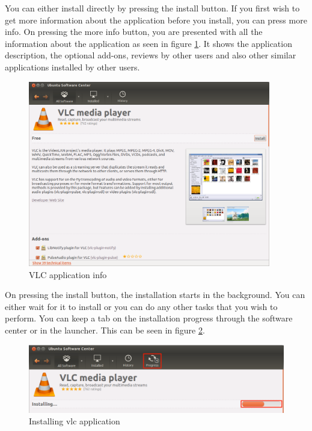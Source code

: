 \par \noindent You can either install directly by pressing the install button. If you first wish to get more information about the application before you install, you can press more info. On pressing the more info button, you are presented with all the information about the application as seen in figure \ref{fig:vlc-info}. It shows the application description, the optional add-ons, reviews by other users and also other similar applications installed by other users.

\begin{figure}[h!]	
	\centering
	\includegraphics[width=300pt]{./images/applications/vlc-info.png}
	\caption{VLC application info}	
	\label{fig:vlc-info}		
\end{figure}

\par \noindent On pressing the install button, the installation starts in the background. You can either wait for it to install or you can do any other tasks that you wish to perform. You can keep a tab on the installation progress through the software center or in the launcher. This can be seen in figure \ref{fig:vlc-install}. \\

\begin{figure}[h!]	
	\centering
	\includegraphics[width=325pt]{./images/applications/vlc-install.png}
	\caption{Installing vlc application}	
	\label{fig:vlc-install}		
\end{figure}

